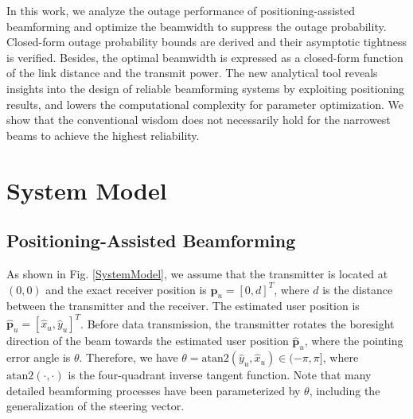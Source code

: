 \documentclass{IEEEtran}
\begin{document}
In this work, {{we analyze the outage performance of positioning-assisted beamforming and optimize the beamwidth to suppress the outage probability. Closed-form outage probability bounds are derived and their asymptotic tightness is verified. Besides, the optimal beamwidth is expressed as a closed-form function of the link distance and the transmit power.}} The new analytical tool reveals insights into the design of reliable beamforming systems by exploiting positioning results, and lowers the computational complexity for parameter optimization. We show that the conventional wisdom does not necessarily hold for the narrowest beams to achieve the highest reliability.
\vspace{-10 pt}
\section{System Model}
{{
\subsection{Positioning-Assisted Beamforming}
As shown in Fig. \ref{SystemModel}, we assume that the transmitter is located at $\left(0, 0\right)$ and the exact receiver position is ${\textbf{p}}_u=\left[0, d\right]^T$, where $d$ is the distance between the transmitter and the receiver. The estimated user position is $\hat{ \textbf{p}}_u = {\left[ {\hat x_u,\hat y_u} \right]^T}$. Before data transmission, the transmitter rotates the boresight direction of the beam towards the estimated user position $\hat{ \textbf{p}}_u$, where the pointing error angle is $\theta$. Therefore, we have $\theta=\textrm{atan2}(\hat y_u, \hat  x_u) \in (-\pi, \pi]$, where $\textrm{atan2}(\cdot,\cdot)$ is the four-quadrant inverse tangent function. Note that many detailed beamforming processes have been parameterized by $\theta$, including the generalization of the steering vector.
}}
\vspace{-5 pt}
\end{document}
